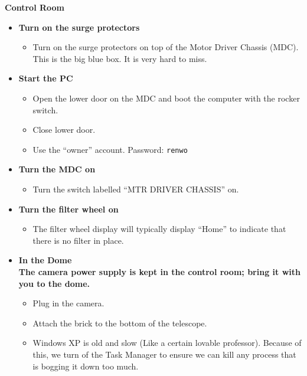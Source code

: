 \documentclass[letterpaper, 12pt]{report}
\begin{document}
{\large\textbf{Control Room}}
\begin{itemize}
	\item \textbf{Turn on the surge protectors}
	\begin{itemize}
		\item Turn on the surge protectors on top of the Motor Driver Chassis (MDC). This is the big blue box. It is very hard to miss.
	\end{itemize}
	\item \textbf{Start the PC}
	\begin{itemize}
		\item Open the lower door on the MDC and boot the computer with the rocker switch.
		\item Close lower door.
		\item Use the ``owner'' account. Password: \texttt{renwo}
	\end{itemize}
	\item \textbf{Turn the MDC on}
	\begin{itemize}
		\item Turn the switch labelled ``MTR DRIVER CHASSIS'' on.
	\end{itemize}
	\item \textbf{Turn the filter wheel on}
	\begin{itemize}
		\item The filter wheel display will typically display ``Home'' to indicate that there is no filter in place.
	\end{itemize}
	\item \textbf{In the Dome} \\
	\noindent \textbf{The camera power supply is kept in the control room; bring it with you to the dome.}
	\begin{itemize}
		\item Plug in the camera.
		\item Attach the brick to the bottom of the telescope.
	\end{itemize}
	\begin{itemize}
		\item Windows XP is old and slow (Like a certain lovable professor). Because of this, we turn of the Task Manager to ensure we can kill any process that is bogging it down too much.
	\end{itemize}
\end{itemize}

\end{document}
